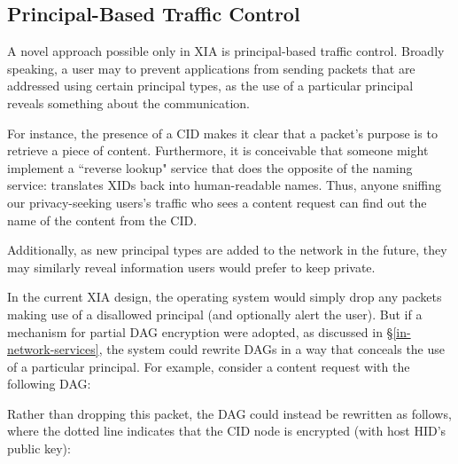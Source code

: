 \documentclass{article}
\newcommand{\entrynode}[1]{
  \SetVertexNormal[Shape      = circle,
                   FillColor  = black,
                   LineWidth  = 0pt,
                   MinSize    = 0pt]
  \Vertex[L={\tiny\,}]{#1}
  \SetVertexNormal[Shape      = circle,
                   FillColor  = white,
                   LineWidth  = 2pt]
}
\newcommand{\encryptednode}[2]{
  \SetVertexNormal[Shape      = circle,
                   FillColor  = white,
                   LineWidth  = 2pt]
  \tikzstyle{VertexStyle}=[dotted, draw, circle]
  \Vertex[#1]{#2}
  \SetVertexNormal[Shape      = circle,
                   FillColor  = white,
                   LineWidth  = 2pt]
}
\begin{document}
\subsection{Principal-Based Traffic Control}
\label{principal-filtering}
A novel approach possible only in XIA is principal-based traffic control. Broadly speaking, a user may to prevent applications from sending packets that are addressed using certain principal types, as the use of a particular principal reveals something about the communication.

For instance, the presence of a CID makes it clear that a packet's purpose is to retrieve a piece of content. Furthermore, it is conceivable that someone might implement a ``reverse lookup" service that does the opposite of the naming service: translates XIDs back into human-readable names. Thus, anyone sniffing our privacy-seeking users's traffic who sees a content request can find out the name of the content from the CID.

Additionally, as new principal types are added to the network in the future, they may similarly reveal information users would prefer to keep private.

In the current XIA design, the operating system would simply drop any packets making use of a disallowed principal (and optionally alert the user). But if a mechanism for partial DAG encryption were adopted, as discussed in \S\ref{in-network-services}, the system could rewrite DAGs in a way that conceals the use of a particular principal. For example, consider a content request with the following DAG:
\begin{center}
\end{center}
Rather than dropping this packet, the DAG could instead be rewritten as follows, where the dotted line indicates that the CID node is encrypted (with host HID's public key):
\begin{center}
\end{center}
\end{document}
